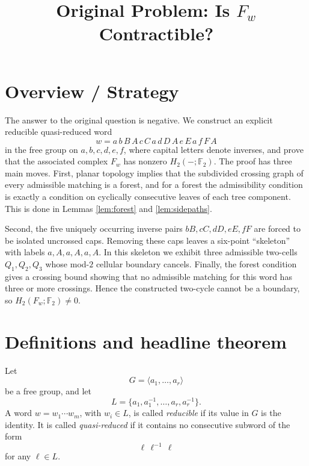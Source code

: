 \documentclass[12pt]{article}
\title{Original Problem: Is \(F_w\) Contractible?}
\author{}
\date{}
\newcommand{\Ftwo}{\mathbb{F}_2}
\theoremstyle{definition}
\begin{document}
\maketitle

\section*{Overview / Strategy}

The answer to the original question is negative.  We construct an explicit reducible quasi-reduced word
\[
w=a\,b\,B\,A\,c\,C\,a\,d\,D\,A\,e\,E\,a\,f\,F\,A
\]
in the free group on \(a,b,c,d,e,f\), where capital letters denote inverses, and prove that the associated complex \(F_w\) has nonzero \(H_2(-;\Ftwo)\).  The proof has three main moves.  First, planar topology implies that the subdivided crossing graph of every admissible matching is a forest, and for a forest the admissibility condition is exactly a condition on cyclically consecutive leaves of each tree component.  This is done in Lemmas \ref{lem:forest} and \ref{lem:sidepaths}.

Second, the five uniquely occurring inverse pairs \(bB,cC,dD,eE,fF\) are forced to be isolated uncrossed caps.  Removing these caps leaves a six-point ``skeleton'' with labels \(a,A,a,A,a,A\).  In this skeleton we exhibit three admissible two-cells \(Q_1,Q_2,Q_3\) whose mod-\(2\) cellular boundary cancels.  Finally, the forest condition gives a crossing bound showing that no admissible matching for this word has three or more crossings.  Hence the constructed two-cycle cannot be a boundary, so \(H_2(F_w;\Ftwo)\neq 0\).

\section{Definitions and headline theorem}

Let
\[
G=\langle a_1,\dots,a_r\rangle
\]
be a free group, and let
\[
L=\{a_1,a_1^{-1},\dots,a_r,a_r^{-1}\}.
\]
A word \(w=w_1\cdots w_m\), with \(w_i\in L\), is called \emph{reducible} if its value in \(G\) is the identity.  It is called \emph{quasi-reduced} if it contains no consecutive subword of the form
\[
\ell\,\ell^{-1}\,\ell
\]
for any \(\ell\in L\).
\end{document}
